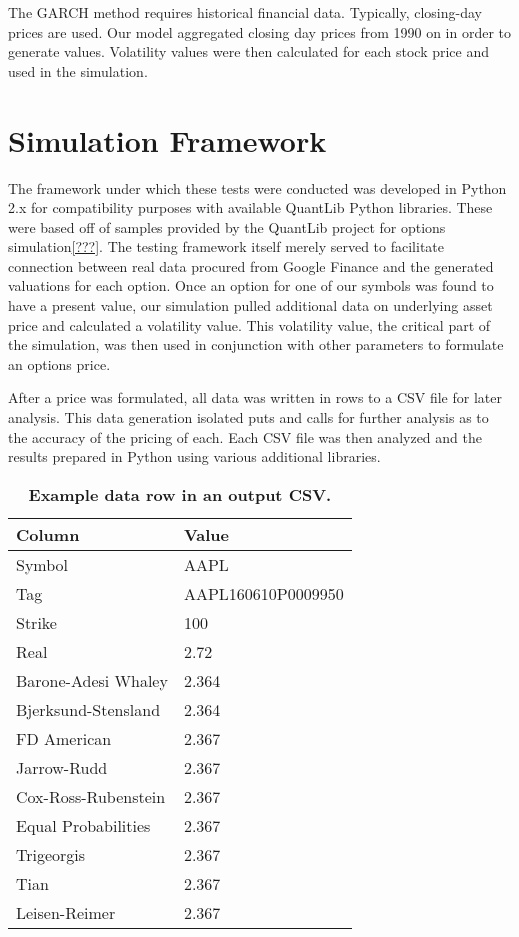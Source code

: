 The GARCH method requires historical financial data. Typically, closing-day prices are used. Our model aggregated closing day prices from 1990 on in order to generate values. Volatility values were then calculated for each stock price and used in the simulation.

\section{Simulation Framework}

The framework under which these tests were conducted was developed in Python 2.x for compatibility purposes with available QuantLib Python libraries. These were based off of samples provided by the QuantLib project for options simulation\ref{???}. The testing framework itself merely served to facilitate connection between real data procured from Google Finance and the generated valuations for each option. Once an option for one of our symbols was found to have a present value, our simulation pulled additional data on underlying asset price and calculated a volatility value. This volatility value, the critical part of the simulation, was then used in conjunction with other parameters to formulate an options price. 

After a price was formulated, all data was written in rows to a CSV file for later analysis. This data generation isolated puts and calls for further analysis as to the accuracy of the pricing of each. Each CSV file was then analyzed and the results prepared in Python using various additional libraries.

\begin{table}[h!]
\centering
\begin{tabu} to .8\textwidth { | X[c] | X[c] |  }
 \hline
 Column & Value \\
 \hline
 Symbol & AAPL \\
 Tag & AAPL160610P0009950  \\
Strike & 100 \\
Real & 2.72 \\
Barone-Adesi Whaley & 2.364 \\
Bjerksund-Stensland & 2.364 \\
FD American & 2.367 \\
Jarrow-Rudd & 2.367 \\
Cox-Ross-Rubenstein & 2.367 \\
Equal Probabilities & 2.367 \\
Trigeorgis & 2.367 \\
Tian & 2.367 \\
Leisen-Reimer & 2.367 \\
\hline
\end{tabu}
\caption {\textbf{Example data row in an output CSV.}}
\end{table}

